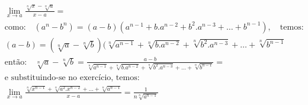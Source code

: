 \begin{ex}
\begin{align}
&\lim_{x\rightarrow a} \frac{\sqrt[n]{x}-\sqrt[n]{a}}{x-a}=\nonumber\\
&\text{como:}\quad (a^n-b^n)=(a-b)(a^{n-1}+b.a^{n-2}+b^2.a^{n-3}+\dots+b^{n-1}),\quad\text{temos:}\nonumber\\
&(a-b) = (\sqrt[n]{a}-\sqrt[n]{b})(\sqrt[n]{a^{n-1}}+\sqrt[n]{b.a^{n-2}}+\sqrt[n]{b^2.a^{n-3}}+\dots+\sqrt[n]{b^{n-1}}\nonumber\\
&\text{então:}\quad\sqrt[n]{a}-\sqrt[n]{b}=\frac{a-b}{\sqrt[n]{a^{n-1}}+\sqrt[n]{b.a^{n-2}}+\sqrt[n]{b^2.a^{n-3}}+\dots+\sqrt[n]{b^{n-1}}}=\nonumber\\
&\text{e substituindo-se no exercício, temos:}\nonumber\\
&\lim_{x\rightarrow a} \frac{\sqrt[n]{x^{n-1}}+\sqrt[n]{a^2.x^{n-2}}+\dots+\sqrt[n]{a^{n-1}}}{x-a}=\frac{1}{n\sqrt[n]{a^{n-1}}}\nonumber
\end{align}
\end{ex}